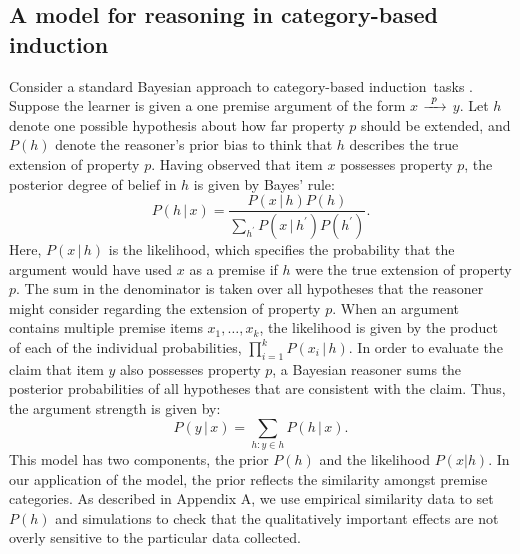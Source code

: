 \documentclass[doc,12pt]{apa}
\newcommand{\given}{\, | \, } %
\newcommand{\cbi}{category-based induction}
\newcommand{\oneverboseargument}[3]{{#1} $\xrightarrow{\mbox{~\scriptsize{#3}}~}$ {#2}}
\begin{document}
\subsection{A model for reasoning in category-based induction}

Consider a standard Bayesian approach to \cbi\ tasks \cite{Hei98,ST03}. Suppose the learner is given a one premise argument of the form \oneverboseargument{$x$}{$y$}{$p$}. Let $h$ denote one possible hypothesis about how far property $p$ should be extended, and $P(h)$ denote the reasoner's prior bias to think that $h$ describes the true extension of property $p$. Having observed that item $x$ possesses property $p$, the posterior degree of belief in $h$ is given by Bayes' rule:
\begin{equation}
\label{eqn:bayes}
P(h \given x) = \frac{ P(x \given h ) P( h ) }{ \sum_{h^\prime} P(x \given h^\prime ) P( h^\prime ) }.
\end{equation}
Here, $P(x \given h)$ is the likelihood, which specifies the probability that the argument would have used $x$ as a premise if $h$ were the true extension of property $p$.
The sum in the denominator is taken over all hypotheses that the reasoner might consider regarding the extension of property $p$. When an argument contains multiple premise items $x_1,\ldots,x_k$, the likelihood is given by the product of each of the individual probabilities, $\prod_{i=1}^k P(x_i \given h )$.
In order to evaluate the claim that item $y$ also possesses property $p$, a  Bayesian reasoner sums the posterior probabilities of all hypotheses that are consistent with the claim. Thus, the argument strength is given by:
\begin{equation}
P( y \given x ) = \sum_{h : y \in h} P(h \given x).
\end{equation}
This model has two components, the prior $P(h)$ and the likelihood $P(x|h)$.  In our application of the model, the prior reflects the similarity amongst premise categories. As described in Appendix A, we use empirical similarity data to set $P(h)$ and simulations to check that the qualitatively important effects are not overly sensitive to the particular data collected.
\end{document}
